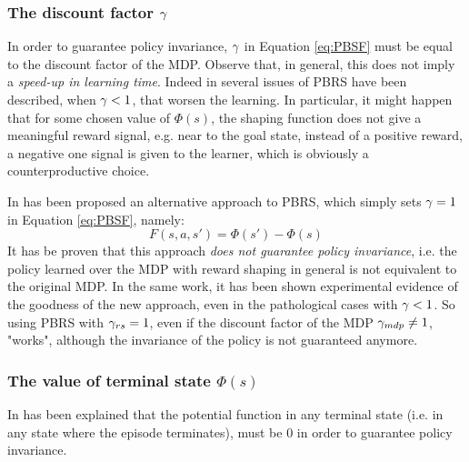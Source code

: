 \subsubsection{The discount factor $\gamma$}
In order to guarantee policy invariance, $\gamma$ in Equation \ref{eq:PBSF} must be equal to the discount factor of the MDP.
Observe that, in general, this does not imply a \emph{speed-up in learning time}. Indeed in \citep{grzes2010improving, 5381523} several issues of PBRS have been described, when $\gamma<1$, that worsen the learning. In particular, it might happen that for some chosen value of $\Phi(s)$, the shaping function does not give a meaningful reward signal, e.g. near to the goal state, instead of a positive reward, a negative one signal is given to the learner, which is obviously a counterproductive choice.

In \citep{grzes2010improving} has been proposed an alternative approach to PBRS, which simply sets $\gamma=1$ in Equation \ref{eq:PBSF}, namely:
\begin{equation}\label{eq:PBRS-no-gamma}
F(s,a,s') = \Phi(s') - \Phi(s)
\end{equation}
It has be proven that this approach \emph{does not guarantee policy invariance}, i.e. the policy learned over the MDP with reward shaping in general is not equivalent to the original MDP. In the same work, it has been shown experimental evidence of the goodness of the new approach, even in the pathological cases with $\gamma<1$. 
So using PBRS with $\gamma_{rs}=1$, even if the discount factor of the MDP $\gamma_{mdp}\neq1$, "works", although the invariance of the policy is not guaranteed anymore.
\subsubsection{The value of terminal state $\Phi(s)$}
In \citep{4567894} has been explained that the potential function in any terminal state (i.e. in any state where the episode terminates), must be 0 in order to guarantee policy invariance.  

